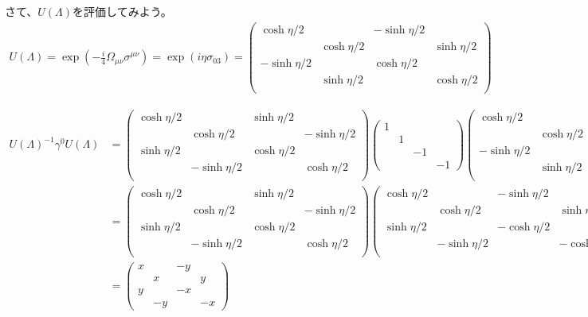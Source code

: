 \documentclass[10pt,a4paper]{jarticle}
\begin{document}
%
さて、$U(\Lambda)$を評価してみよう。
\begin{align}
U(\Lambda)
=
\exp\left( -\frac{i}{4} \Omega_{\mu\nu} \sigma^{\mu\nu} \right)
=
\exp\left( i \eta \sigma_{03} \right)
=
\left(\begin{array}{cccc}
\cosh\eta/2 & & -\sinh\eta/2 & \\
& \cosh\eta/2 & & \sinh\eta/2 \\
-\sinh\eta/2 & & \cosh\eta/2 & \\
& \sinh\eta/2 & & \cosh\eta/2 \\
\end{array}\right)
\end{align}

{\tiny
\begin{align}
U(\Lambda)^{-1} \gamma^0 U(\Lambda)
&=
\left(\begin{array}{cccc}
\cosh\eta/2 & & \sinh\eta/2 & \\
& \cosh\eta/2 & & -\sinh\eta/2 \\
\sinh\eta/2 & & \cosh\eta/2 & \\
& -\sinh\eta/2 & & \cosh\eta/2 \\
\end{array}\right)
%
\left(\begin{array}{cccc}
1&&&\\
&1&&\\
&&-1&\\
&&&-1
\end{array}\right)
%
\left(\begin{array}{cccc}
\cosh\eta/2 & & -\sinh\eta/2 & \\
& \cosh\eta/2 & & \sinh\eta/2 \\
-\sinh\eta/2 & & \cosh\eta/2 & \\
& \sinh\eta/2 & & \cosh\eta/2 \\
\end{array}\right) \nonumber\\
%
&=
\left(\begin{array}{cccc}
\cosh\eta/2 & & \sinh\eta/2 & \\
& \cosh\eta/2 & & -\sinh\eta/2 \\
\sinh\eta/2 & & \cosh\eta/2 & \\
& -\sinh\eta/2 & & \cosh\eta/2 \\
\end{array}\right)
%
\left(\begin{array}{cccc}
\cosh\eta/2 & & -\sinh\eta/2 & \\
& \cosh\eta/2 & & \sinh\eta/2 \\
\sinh\eta/2 & & -\cosh\eta/2 & \\
& -\sinh\eta/2 & & -\cosh\eta/2 \\
\end{array}\right) \nonumber\\
%
&=
\left(\begin{array}{cccc}
x&&-y&\\
&x&&y\\
y&&-x&\\
&-y&&-x
\end{array}\right) \nonumber\\
\end{align}
}
\end{document}
